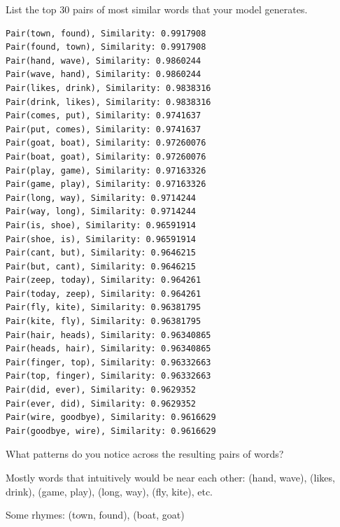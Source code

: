 \problem[1]
List the top 30 pairs of most similar words that your model generates.
\begin{solution}
	\begin{verbatim}
Pair(town, found), Similarity: 0.9917908
Pair(found, town), Similarity: 0.9917908
Pair(hand, wave), Similarity: 0.9860244
Pair(wave, hand), Similarity: 0.9860244
Pair(likes, drink), Similarity: 0.9838316
Pair(drink, likes), Similarity: 0.9838316
Pair(comes, put), Similarity: 0.9741637
Pair(put, comes), Similarity: 0.9741637
Pair(goat, boat), Similarity: 0.97260076
Pair(boat, goat), Similarity: 0.97260076
Pair(play, game), Similarity: 0.97163326
Pair(game, play), Similarity: 0.97163326
Pair(long, way), Similarity: 0.9714244
Pair(way, long), Similarity: 0.9714244
Pair(is, shoe), Similarity: 0.96591914
Pair(shoe, is), Similarity: 0.96591914
Pair(cant, but), Similarity: 0.9646215
Pair(but, cant), Similarity: 0.9646215
Pair(zeep, today), Similarity: 0.964261
Pair(today, zeep), Similarity: 0.964261
Pair(fly, kite), Similarity: 0.96381795
Pair(kite, fly), Similarity: 0.96381795
Pair(hair, heads), Similarity: 0.96340865
Pair(heads, hair), Similarity: 0.96340865
Pair(finger, top), Similarity: 0.96332663
Pair(top, finger), Similarity: 0.96332663
Pair(did, ever), Similarity: 0.9629352
Pair(ever, did), Similarity: 0.9629352
Pair(wire, goodbye), Similarity: 0.9616629
Pair(goodbye, wire), Similarity: 0.9616629
	\end{verbatim}
\end{solution}

\problem[2]
What patterns do you notice across the resulting pairs of words?
\begin{solution}
	Mostly words that intuitively would be near each other: (hand, wave), (likes, drink), (game, play), (long, way), (fly, kite), etc.

	Some rhymes: (town, found), (boat, goat)
\end{solution}




